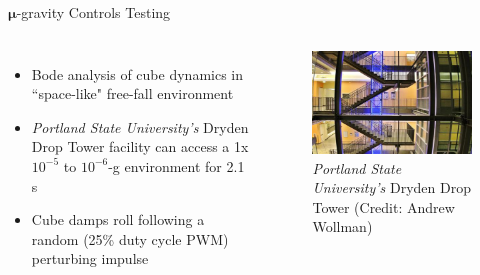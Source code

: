 \documentclass[slidestop,compress]{beamer}
\begin{document}
\begin{frame}[plain]
\begin{block}{\centering $\pmb \mu$-gravity Controls Testing}
\begin{columns}
\begin{itemize}
\item Bode analysis of cube dynamics in ``space-like" free-fall environment
\item {\it Portland State University's} Dryden Drop Tower facility can access a 1x$10^{-5}$ to $10^{-6}$-g environment for 2.1 s
\item Cube damps roll following a random (25\% duty cycle PWM) perturbing impulse\\
\end{itemize}
\begin{figure}[!ht]
\centering
{\includegraphics[width=0.9\linewidth]{MCHS-NASA-2016_03.jpg}
\caption{{\it Portland State University's} Dryden Drop Tower (Credit: Andrew Wollman)}
} 
\end{figure}
\end{columns}
\end{block}    
\end{frame}
\end{document}

